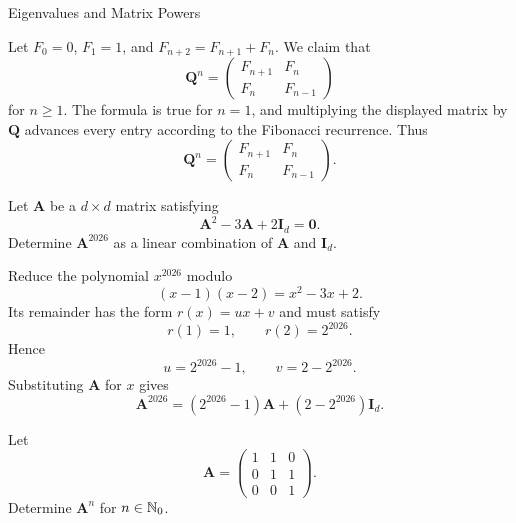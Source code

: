 \begin{expectedproblemgroup}{Eigenvalues and Matrix Powers}
        \begin{expectedsubsolution}
            Let $F_0=0$, $F_1=1$, and $F_{n+2}=F_{n+1}+F_n$. We claim that
            \[
                \mathbf{Q}^n
                =
                \begin{pmatrix}
                    F_{n+1} & F_n\\
                    F_n & F_{n-1}
                \end{pmatrix}
            \]
            for $n\geq1$. The formula is true for $n=1$, and multiplying the
            displayed matrix by $\mathbf{Q}$ advances every entry according to the
            Fibonacci recurrence. Thus
            \[
                \boxed{
                    \mathbf{Q}^n
                    =
                    \begin{pmatrix}
                        F_{n+1} & F_n\\
                        F_n & F_{n-1}
                    \end{pmatrix}
                }.
            \]
        \end{expectedsubsolution}

        \begin{expectedsubproblem}
            Let $\mathbf{A}$ be a $d\times d$ matrix satisfying
            \[
                \mathbf{A}^2-3\mathbf{A}+2\mathbf{I}_d=\mathbf{0}.
            \]
            Determine $\mathbf{A}^{2026}$ as a linear combination of
            $\mathbf{A}$ and $\mathbf{I}_d$.
        \end{expectedsubproblem}

        \begin{expectedsubsolution}
            Reduce the polynomial $x^{2026}$ modulo
            \[
                (x-1)(x-2)=x^2-3x+2.
            \]
            Its remainder has the form $r(x)=ux+v$ and must satisfy
            \[
                r(1)=1,
                \qquad
                r(2)=2^{2026}.
            \]
            Hence
            \[
                u=2^{2026}-1,
                \qquad
                v=2-2^{2026}.
            \]
            Substituting $\mathbf{A}$ for $x$ gives
            \[
                \boxed{
                    \mathbf{A}^{2026}
                    =
                    (2^{2026}-1)\mathbf{A}
                    +(2-2^{2026})\mathbf{I}_d
                }.
            \]
        \end{expectedsubsolution}

        \begin{expectedsubproblem}
            Let
            \[
                \mathbf{A}
                =
                \begin{pmatrix}
                    1 & 1 & 0\\
                    0 & 1 & 1\\
                    0 & 0 & 1
                \end{pmatrix}.
            \]
            Determine $\mathbf{A}^n$ for $n\in\mathbb{N}_0$.
        \end{expectedsubproblem}


\end{expectedproblemgroup}

